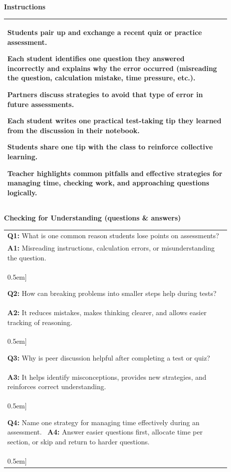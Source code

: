 \documentclass{article}
\begin{document}
\begin{flushleft}
\vspace{0.5cm}
\noindent
{\large \textbf{Instructions}} \\[0.2em]

\begin{tabular}{|p{0.9\linewidth}|}
\hline

Students pair up and exchange a recent quiz or practice assessment.

Each student identifies one question they answered incorrectly and explains why the error occurred (misreading the question, calculation mistake, time pressure, etc.).

Partners discuss strategies to avoid that type of error in future assessments.

Each student writes one practical test-taking tip they learned from the discussion in their notebook.

Students share one tip with the class to reinforce collective learning.

Teacher highlights common pitfalls and effective strategies for managing time, checking work, and approaching questions logically. \\
\hline
\end{tabular}

\newpage
\noindent
{\large \textbf{Checking for Understanding (questions & answers)}} \\[0.2em]

\begin{tabular}{|p{0.9\linewidth}|}
\hline
\textbf{Q1:} What is one common reason students lose points on assessments? \\
\textbf{A1:} Misreading instructions, calculation errors, or misunderstanding the question. \\0.5em]

\textbf{Q2:} How can breaking problems into smaller steps help during tests? \\
\textbf{A2:} It reduces mistakes, makes thinking clearer, and allows easier tracking of reasoning. \\0.5em]

\textbf{Q3:} Why is peer discussion helpful after completing a test or quiz? \\
\textbf{A3:} It helps identify misconceptions, provides new strategies, and reinforces correct understanding. \\0.5em]

\textbf{Q4:} Name one strategy for managing time effectively during an assessment. \
\textbf{A4:} Answer easier questions first, allocate time per section, or skip and return to harder questions. \\0.5em]


\end{tabular}
\end{flushleft}
\end{document}
